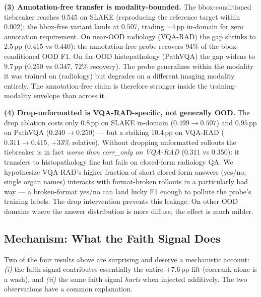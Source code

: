 \documentclass[11pt]{article}
\begin{document}
\textbf{(3) Annotation-free transfer is modality-bounded.} The
bbox-conditioned tiebreaker reaches $0.545$ on SLAKE (reproducing the
reference target within $0.002$); the bbox-free variant lands at
$0.507$, trading $\sim$4\,pp in-domain for zero annotation requirement.
On near-OOD radiology (VQA-RAD) the gap shrinks to $2.5$\,pp ($0.415$
vs $0.440$): the annotation-free probe recovers $94\%$ of the
bbox-conditioned OOD F1. On far-OOD histopathology (PathVQA) the gap
widens to $9.7$\,pp ($0.250$ vs $0.347$, $72\%$ recovery). The probe
generalizes within the modality it was trained on (radiology) but
degrades on a different imaging modality entirely. The annotation-free
claim is therefore stronger inside the training-modality envelope than
across it.

\textbf{(4) Drop-unformatted is VQA-RAD-specific, not generally OOD.}
The drop ablation costs only $0.8$\,pp on SLAKE in-domain ($0.499
\rightarrow 0.507$) and $0.95$\,pp on PathVQA ($0.240 \rightarrow
0.250$) --- but a striking $10.4$\,pp on VQA-RAD ($0.311 \rightarrow
0.415$, $+33\%$ relative). Without dropping unformatted rollouts the
tiebreaker is in fact \emph{worse than corr\_only on VQA-RAD} ($0.311$
vs $0.350$): it transfers to histopathology fine but fails on
closed-form radiology QA. We hypothesize VQA-RAD's higher fraction of
short closed-form answers (yes/no, single organ names) interacts with
format-broken rollouts in a particularly bad way --- a broken-format
yes/no can land lucky F1 enough to pollute the probe's training labels.
The drop intervention prevents this leakage. On other OOD domains where
the answer distribution is more diffuse, the effect is much milder.

\subsection{Mechanism: What the Faith Signal Does}
\label{sec:mechanism}

Two of the four results above are surprising and deserve a mechanistic
account: \emph{(i)} the faith signal contributes essentially the entire
+7.6\,pp lift (corrrank alone is a wash), and \emph{(ii)} the same faith
signal \emph{hurts} when injected additively. The two observations have
a common explanation.
\end{document}
